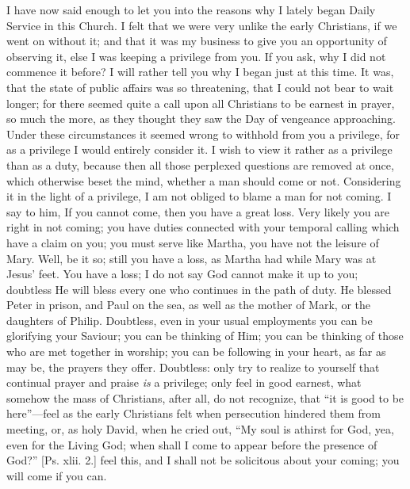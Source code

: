 I have now said enough to let you into the reasons why I lately
began Daily Service in this Church. I felt that we were very unlike
the early Christians, if we went on without it; and that it was my
business to give you an opportunity of observing it, else I was
keeping a privilege from you. If you ask, why I did not commence it
before? I will rather tell you why I began just at this time. It was,
that the state of public affairs was so threatening, that I could not
bear to wait longer; for there seemed quite a call upon all Christians
to be earnest in prayer, so much the more, as they thought they saw
the Day of vengeance approaching. Under these circumstances it seemed
wrong to withhold from you a privilege, for as a privilege I would
entirely consider it. I wish to view it rather as a privilege than as
a duty, because then all those perplexed questions are removed at
once, which otherwise beset the mind, whether a man should come or
not. Considering it in the light of a privilege, I am not obliged to
blame a man for not coming. I say to him, If you cannot come, then you
have a great loss. Very likely you are right in not coming; you have
duties connected with your temporal calling which have a claim on you;
you must serve like Martha, you have not the leisure of Mary. Well, be
it so; still you have a loss, as Martha had while Mary was at Jesus'
feet. You have a loss; I do not say God cannot make it up to you;
doubtless He will bless every one who continues in the path of duty.
He blessed Peter in prison, and Paul on the sea, as well as the mother
of Mark, or the daughters of Philip. Doubtless, even in your usual
employments you can be glorifying your Saviour; you can be thinking of
Him; you can be thinking of those who are met together in worship; you
can be following in your heart, as far as may be, the prayers they
offer. Doubtless: only try to realize to yourself that continual
prayer and praise \emph{is} a privilege; only feel in good earnest,
what somehow the mass of Christians, after all, do not recognize, that
``it is good to be here''—feel as the early Christians felt
when persecution hindered them from meeting, or, as holy David, when
he cried out, ``My soul is athirst for God, yea, even for the
Living God; when shall I come to appear before the presence of
God?'' [Ps. xlii. 2.] feel this, and I shall not be solicitous
about your coming; you will come if you can.


